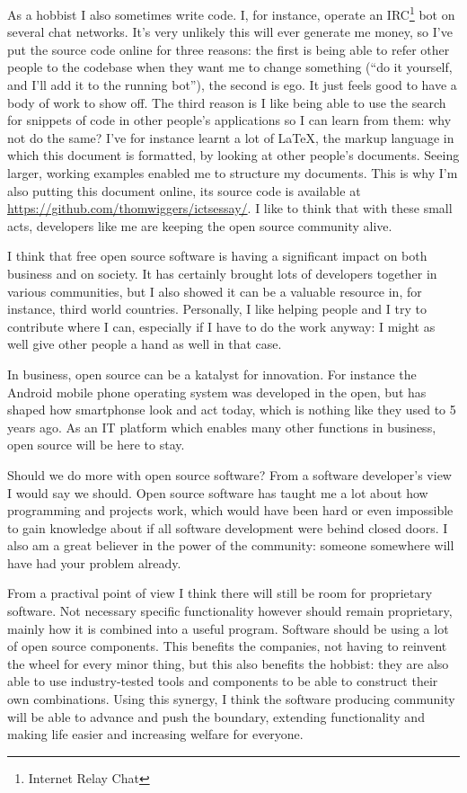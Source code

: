 \documentclass{article}
\begin{document}
As a hobbist I also sometimes write code. I, for instance, operate an
IRC\footnote{Internet Relay Chat} bot on several chat networks. It's very
unlikely this will ever generate me money, so I've put the source code online
for three reasons: the first is being able to refer other people to the
codebase when they want me to change something (``do it yourself, and I'll add
it to the running bot''), the second is ego. It just feels good to have a body
of work to show off. The third reason is I like being able to use the search
for snippets of code in other people's applications so I can learn from them:
why not do the same? I've for instance learnt a lot of \LaTeX, the markup
language in which this document is formatted, by looking at other people's
documents. Seeing larger, working examples enabled me to structure my
documents. This is why I'm also putting this document online, its source code
is available at \url{https://github.com/thomwiggers/ictsessay/}. I like to
think that with these small acts, developers like me are keeping the open
source community alive.

I think that free open source software is having a significant impact on both
business and on society. It has certainly brought lots of developers together
in various communities, but I also showed it can be a valuable resource in, for
instance, third world countries. Personally, I like helping people and I try to
contribute where I can, especially if I have to do the work anyway: I might as
well give other people a hand as well in that case. 

In business, open source can be a katalyst for innovation. For instance the
Android mobile phone operating system was developed in the open, but has shaped
how smartphonse look and act today, which is nothing like they used to 5 years
ago. As an IT platform which enables many other functions in business, open
source will be here to stay. 

Should we do more with open source software? From a software developer's view
I would say we should. Open source software has taught me a lot about how
programming and projects work, which would have been hard or even impossible to
gain knowledge about if all software development were behind closed doors.
I also am a great believer in the power of the community: someone somewhere
will have had your problem already.
 
From a practival point of view I think there will still be room for proprietary
software. Not necessary specific functionality however should remain
proprietary, mainly how it is combined into a useful program. Software should
be using a lot of open source components. This benefits the companies, not
having to reinvent the wheel for every minor thing, but this also benefits the
hobbist: they are also able to use industry-tested tools and components to be
able to construct their own combinations. Using this synergy, I think the
software producing community will be able to advance and push the boundary,
extending functionality and making life easier and increasing welfare for
everyone.


\printbibliography 
\end{document}
